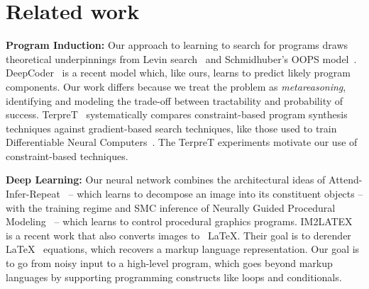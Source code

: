 \documentclass{article}
\theoremstyle{definition}
\begin{document}
\begin{table}[h]

\section{Related work}

\textbf{Program Induction:}
Our approach to learning to search for programs draws theoretical
underpinnings from Levin
search~\citep{levin1973universal,solomonoff1984optimum} and
Schmidhuber's OOPS model~\citep{schmidhuber2004optimal}.
DeepCoder~\citep{BalGauBroetal16} is a recent model which, like ours, learns to predict likely program components.
Our work differs because we treat
the problem as \emph{metareasoning}, identifying and modeling
the trade-off between tractability and probability of success.
TerpreT~\citep{gaunt2016terpret} 
systematically compares constraint-based program synthesis techniques
against gradient-based search techniques, like those used to train
Differentiable Neural Computers~\citep{graves2016hybrid}.  The TerpreT
experiments motivate our use of constraint-based techniques.



\textbf{Deep Learning:} Our neural network combines the architectural ideas of Attend-Infer-Repeat~\citep{eslami1603attend} -- which learns to decompose an image into its constituent objects -- with the training regime and SMC inference  of Neurally Guided Procedural Modeling~\cite{ritchie2016neurally} -- which learns to control procedural graphics programs.
IM2LATEX~\citep{im2latex} is a recent work that also converts images to
~\LaTeX.
Their goal is to derender  \LaTeX~ equations,
which recovers a markup language representation.
Our goal is to go from
noisy input to a high-level program,
which goes beyond markup languages by supporting
programming constructs like loops and conditionals.



\end{table}
\end{document}
